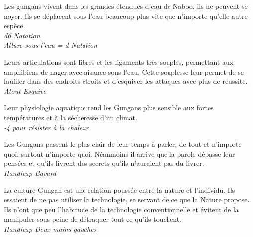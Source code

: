 \begin{description}[align=left]
\item [Aquatique] 					%
		Les gungans vivent dans les grandes étendues d’eau de Naboo, ils ne peuvent se noyer. Ils se déplacent sous l’eau beaucoup plus vite que n’importe qu’elle autre espèce.\\
		\textit{d6 Natation}\\
		\textit{Allure sous l’eau = d Natation}
		
\item [Mollusque] 					%
		Leurs articulations sont libres et les ligaments très souples, permettant aux amphibiens de nager avec aisance sous l’eau. Cette souplesse leur permet de se faufiler dans des endroits étroits et d’esquiver les attaques avec plus de réussite.\\
		\textit{Atout Esquive}

\item [Craint la chaleur] 			%
		Leur physiologie aquatique rend les Gungans plus sensible aux fortes températures et à la sécheresse d’un climat.\\
		\textit{-4 pour résister à la chaleur}

\item [Langue bien pendue] 			%
		Les Gungans passent le plus clair de leur temps à parler, de tout et n’importe quoi, surtout n’importe quoi. Néanmoins il arrive que la parole dépasse leur pensées et qu’ils livrent des secrets qu’ils n’auraient pas du livrer.\\
		\textit{Handicap Bavard}

\item [Maladroit] 					%
		La culture Gungan est une relation poussée entre la nature et l’individu. Ils essaient de ne pas utiliser la technologie, se servant de ce que la Nature propose. Ils n’ont que peu l’habitude de la technologie conventionnelle et évitent de la manipuler sous peine de détraquer tout ce qu’ils touchent.\\
		\textit{Handicap Deux mains gauches}
\end{description}